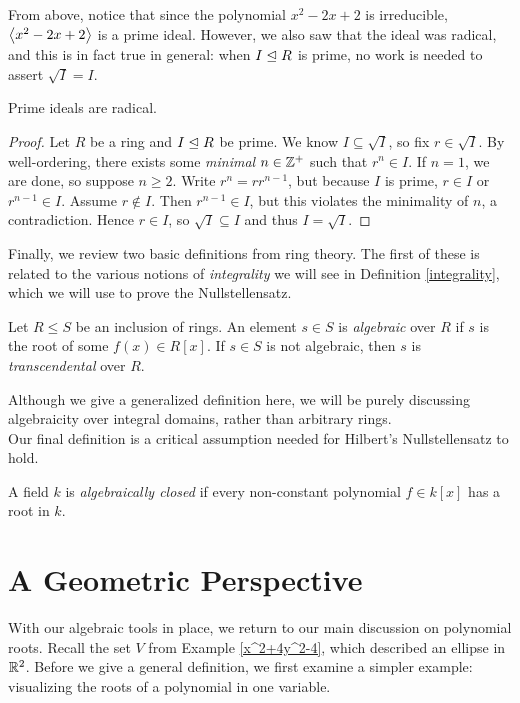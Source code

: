 \documentclass{article}
\begin{document}
From above, notice that since the polynomial $x^2-2x+2$ is irreducible, $\left\langle x^2-2x+2\right\rangle$ is a prime ideal. However, we also saw that the ideal was radical, and this is in fact true in general: when $I\trianglelefteq R$ is prime, no work is needed to assert $\sqrt I = I$.

\begin{proposition}\label{primeradical}
Prime ideals are radical.
\end{proposition}
\begin{proof}
Let $R$ be a ring and $I\trianglelefteq R$ be prime. We know $I\subseteq \sqrt I$, so fix $r\in \sqrt I$. By well-ordering, there exists some \textit{minimal} $n\in\mathbb Z^+$ such that $r^n\in I$. If $n=1$, we are done, so suppose $n\geq 2$. Write $r^n = rr^{n-1}$, but because $I$ is prime, $r\in I$ or $r^{n-1}\in I$. Assume $r\not\in I$. Then $r^{n-1} \in I$, but this violates the minimality of $n$, a contradiction. Hence $r\in I$, so $\sqrt I\subseteq I$ and thus $I=\sqrt I$.
\end{proof}

Finally, we review two basic definitions from ring theory. The first of these is related to the various notions of \textit{integrality} we will see in Definition \ref{integrality}, which we will use to prove the Nullstellensatz.
\begin{definition}
Let $R\leq S$ be an inclusion of rings. An element $s\in S$ is \textit{algebraic} over $R$ if $s$ is the root of some $f(x)\in R[x]$. If $s\in S$ is not algebraic, then $s$ is \textit{transcendental} over $R$.
\end{definition}

Although we give a generalized definition here, we will be purely discussing algebraicity over integral domains, rather than arbitrary rings.
\\

Our final definition is a critical assumption needed for Hilbert's Nullstellensatz to hold.
\begin{definition}
A field $k$ is \textit{algebraically closed} if every non-constant polynomial $f\in k[x]$ has a root in $k$.
\end{definition}

\section{A Geometric Perspective}
With our algebraic tools in place, we return to our main discussion on polynomial roots. Recall the set $V$ from Example \ref{x^2+4y^2-4}, which described an ellipse in $\mathbb R^2$. Before we give a general definition, we first examine a simpler example: visualizing the roots of a polynomial in one variable.
\end{document}
